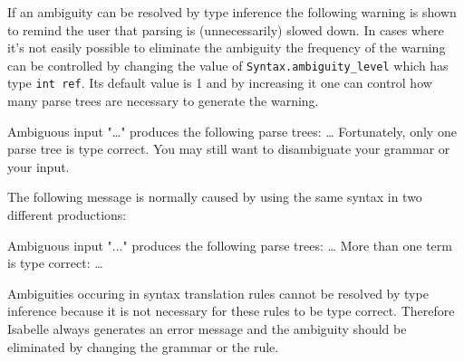 If an ambiguity can be resolved by type inference the following
warning is shown to remind the user that parsing is (unnecessarily)
slowed down.  In cases where it's not easily possible to eliminate the
ambiguity the frequency of the warning can be controlled by changing
the value of {\tt Syntax.ambiguity_level} which has type {\tt int
ref}.  Its default value is 1 and by increasing it one can control how
many parse trees are necessary to generate the warning.

\begin{ttbox}
{\out Ambiguous input "\dots"}
{\out produces the following parse trees:}
{\out \dots}
{\out Fortunately, only one parse tree is type correct.}
{\out You may still want to disambiguate your grammar or your input.}
\end{ttbox}

The following message is normally caused by using the same
syntax in two different productions:

\begin{ttbox}
{\out Ambiguous input "..."}
{\out produces the following parse trees:}
{\out \dots}
{\out More than one term is type correct:}
{\out \dots}
\end{ttbox}

Ambiguities occuring in syntax translation rules cannot be resolved by
type inference because it is not necessary for these rules to be type
correct.  Therefore Isabelle always generates an error message and the
ambiguity should be eliminated by changing the grammar or the rule.


